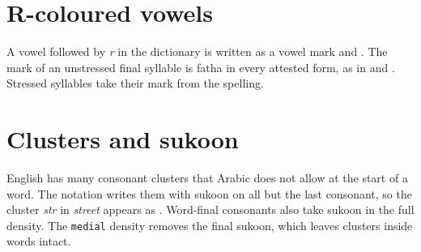 \begin{table}[ht]\centering\small

\caption{Glides and diphthongs.}\label{tab:wai}
\end{table}

\section{R-coloured vowels}
A vowel followed by \emph{r} in the dictionary is written as a vowel mark and . The mark of an unstressed final syllable is fatha in every attested form, as in  and . Stressed syllables take their mark from the spelling.

\begin{table}[ht]\centering\small

\caption{R-coloured vowels.}\label{tab:wr}
\end{table}

\section{Clusters and sukoon}
English has many consonant clusters that Arabic does not allow at the start of a word. The notation writes them with sukoon on all but the last consonant, so the cluster \emph{str} in \emph{street} appears as . Word-final consonants also take sukoon in the full density. The \texttt{medial} density removes the final sukoon, which leaves clusters inside words intact.

\begin{table}[ht]\centering\small

\caption{Clusters, written with sukoon.}\label{tab:wclusters}
\end{table}
